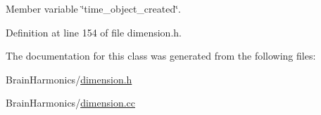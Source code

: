 Member variable \char`\"{}time\+\_\+object\+\_\+created\char`\"{}. 



Definition at line 154 of file dimension.\+h.



The documentation for this class was generated from the following files\+:\begin{DoxyCompactItemize}
\item 
Brain\+Harmonics/\mbox{\hyperlink{dimension_8h}{dimension.\+h}}\item 
Brain\+Harmonics/\mbox{\hyperlink{dimension_8cc}{dimension.\+cc}}\end{DoxyCompactItemize}
